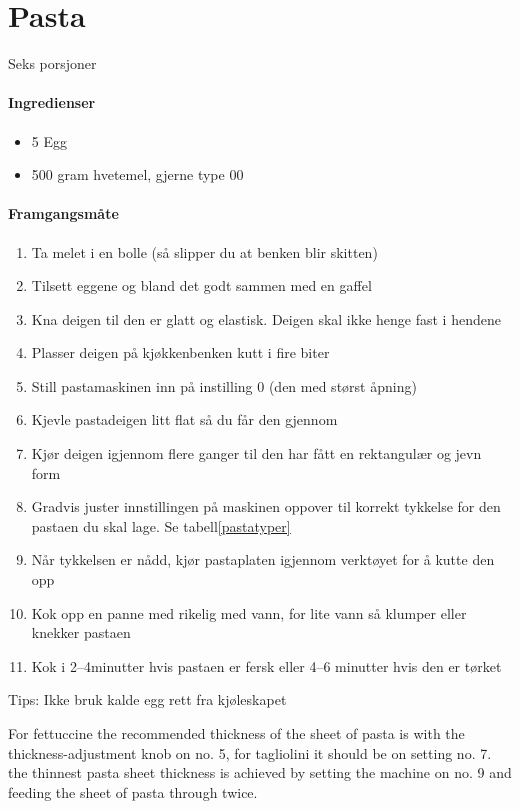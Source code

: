 \section{﻿Pasta}
Seks porsjoner

\paragraph{Ingredienser}
\begin{itemize}[noitemsep]
	\item 5 Egg
	\item 500 gram hvetemel, gjerne type 00
\end{itemize}

\paragraph{Framgangsmåte}
\begin{enumerate}[noitemsep]
	\item Ta melet i en bolle (så slipper du at benken blir skitten)
	\item Tilsett eggene og bland det godt sammen med en gaffel
	\item Kna deigen til den er glatt og elastisk. Deigen skal ikke henge fast i hendene
	\item Plasser deigen på kjøkkenbenken kutt i fire biter
	\item Still pastamaskinen inn på instilling 0 (den med størst åpning)
	\item Kjevle pastadeigen litt flat så du får den gjennom
	\item Kjør deigen igjennom flere ganger til den har fått en rektangulær og jevn form
	\item Gradvis juster innstillingen på maskinen oppover til korrekt tykkelse for den pastaen du skal lage. Se tabell\ref{pastatyper}
	\item Når tykkelsen er nådd, kjør pastaplaten igjennom verktøyet for å kutte den opp
	\item Kok opp en panne med rikelig med vann, for lite vann så klumper eller knekker pastaen
	\item Kok i 2--4minutter hvis pastaen er fersk eller 4--6 minutter hvis den er tørket
\end{enumerate}

Tips: Ikke bruk kalde egg rett fra kjøleskapet %

For fettuccine the recommended thickness of the sheet of pasta is with the  thickness-adjustment knob on no. 5, for tagliolini it should
be on setting no. 7.
the thinnest pasta sheet thickness is achieved by setting the machine
on no. 9 and feeding the sheet of pasta through twice.

